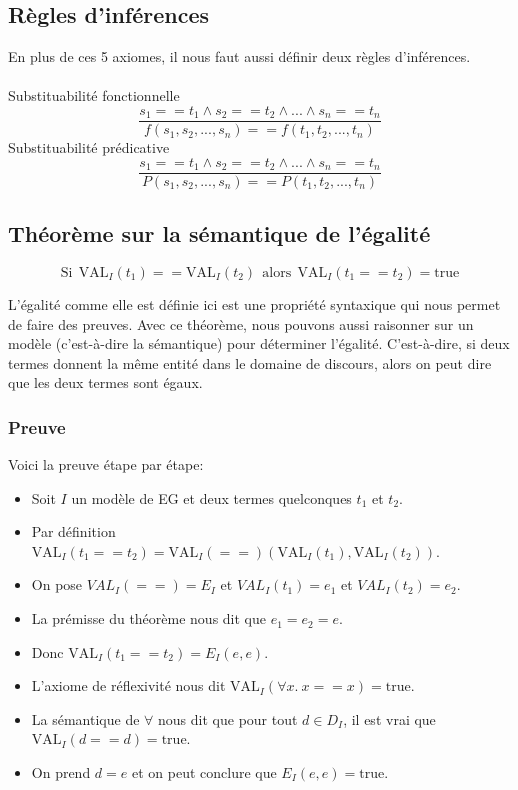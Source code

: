 \subsection{Règles d'inférences}
En plus de ces 5 axiomes, il nous faut aussi définir deux règles d'inférences.\\ \\
Substituabilité fonctionnelle 
	$$ \frac{s_{1}==t_{1} \land s_{2}==t_{2} \land ... \land s_{n}==t_{n}}{f(s_{1},s_{2},...,s_{n}) == f(t_{1},t_{2},...,t_{n})}$$ 
	Substituabilité prédicative 
	$$ \frac{s_{1}==t_{1} \land s_{2}==t_{2} \land ... \land s_{n}==t_{n}}{P(s_{1},s_{2},...,s_{n}) == P(t_{1},t_{2},...,t_{n})}$$ 

\subsection{Théorème sur la sémantique de l'égalité}

$$\mathrm{Si}\ \ \mathrm{VAL}_{I}(t_{1}) ==  \mathrm{VAL}_{I}(t_{2}) \ \ \mathrm{alors}\ \  \mathrm{VAL}_{I}(t_{1} == t_{2}) = \mathrm{true}$$

L'égalité comme elle est définie ici est une propriété syntaxique qui nous permet de faire des preuves.
Avec ce théorème, nous pouvons aussi raisonner sur un modèle (c'est-à-dire la sémantique) pour déterminer l'égalité.
C'est-à-dire, si deux termes donnent la même entité dans le domaine de discours, alors on peut dire que les
deux termes sont égaux.

\subsubsection{Preuve}

Voici la preuve étape par étape:
\begin{itemize}
\item Soit $I$ un modèle de EG et deux termes quelconques $t_{1}$ et $t_{2}$.
\item Par définition $\mathrm{VAL}_{I}(t_{1} == t_{2}) = \mathrm{VAL}_{I}(==)(\mathrm{VAL}_{I}(t_{1}), \mathrm{VAL}_{I}(t_{2}))$.
\item On pose $VAL_{I}(==) = E_{I}$ et $VAL_{I}(t_{1}) = e_1$ et $VAL_{I}(t_{2}) = e_2$.
\item La prémisse du théorème nous dit que $e_1 = e_2 = e$.
\item Donc $\mathrm{VAL}_{I}(t_{1} == t_{2}) =E_{I}(e,e)$.
\item L'axiome de réflexivité nous dit $\mathrm{VAL}_{I}(\forall x.\ x==x)= \mathrm{true}$.
\item La sémantique de $\forall$ nous dit que pour tout $d \in D_I$, il est vrai que $\mathrm{VAL}_{I}(d==d)=\mathrm{true}$.
\item On prend $d=e$ et on peut conclure que $E_{I}(e,e)=\mathrm{true}$.
\end{itemize}

